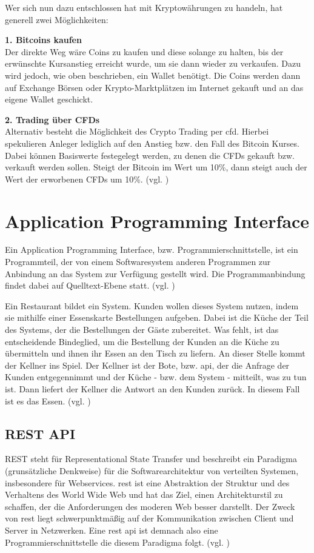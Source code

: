 \documentclass[oneside]{ausarbeitung}
\begin{document}
Wer sich nun dazu entschlossen hat mit Kryptowährungen zu handeln,
hat generell zwei Möglichkeiten:

\textbf{1. Bitcoins kaufen} \\
Der direkte Weg wäre Coins zu kaufen und diese solange zu halten, bis
der erwünschte Kursanstieg erreicht wurde, um sie dann wieder zu
verkaufen. Dazu wird jedoch, wie oben beschrieben, ein Wallet
benötigt. Die Coins werden dann auf Exchange Börsen oder
Krypto-Marktplätzen im Internet gekauft und an das eigene Wallet
geschickt.  

\textbf{2. Trading über CFDs} \\
Alternativ besteht die Möglichkeit des Crypto Trading per \ac{cfd}.
Hierbei spekulieren Anleger lediglich auf den Anstieg bzw. den Fall
des Bitcoin Kurses. Dabei können Basiswerte festegelegt werden, zu
denen die CFDs gekauft bzw. verkauft werden sollen. Steigt der Bitcoin
im Wert um 10\%, dann steigt auch der Wert der erworbenen CFDs um
10\%. (vgl. \cite{crypto_trading})


\section{Application Programming Interface}
\label{sec:api}

Ein Application Programming Interface, bzw. Programmierschnittstelle,
ist ein Programmteil, der von einem Softwaresystem anderen Programmen
zur Anbindung an das System zur Verfügung gestellt wird. Die
Programmanbindung findet dabei auf Quelltext-Ebene statt. (vgl.
\cite{api_definition})

Ein Restaurant bildet ein System. Kunden wollen dieses System nutzen,
indem sie mithilfe einer Essenskarte Bestellungen aufgeben. Dabei ist
die Küche der Teil des Systems, der die Bestellungen der Gäste
zubereitet. Was fehlt, ist das entscheidende Bindeglied, um die
Bestellung der Kunden an die Küche zu übermitteln und ihnen ihr
Essen an den Tisch zu liefern. An dieser Stelle kommt der Kellner ins
Spiel. Der Kellner ist der Bote, bzw. \ac{api}, der die Anfrage der
Kunden entgegennimmt und der Küche - bzw. dem System - mitteilt, was
zu tun ist. Dann liefert der Kellner die Antwort an den Kunden
zurück. In diesem Fall ist es das Essen. (vgl. \cite{api_example})    

\subsection{REST API}
\label{sub:rest_api}
REST steht für Representational State Transfer und beschreibt ein
Paradigma (grunsätzliche Denkweise) für die Softwarearchitektur von
verteilten Systemen, insbesondere für Webservices. \ac{rest} ist eine
Abstraktion der Struktur und des Verhaltens des World Wide Web und hat
das Ziel, einen Architekturstil zu schaffen, der die Anforderungen des
moderen Web besser darstellt. Der Zweck von \ac{rest} liegt
schwerpunktmäßig auf der Kommunikation zwischen Client und Server in
Netzwerken. Eine \ac{rest} \ac{api} ist demnach also eine
Programmierschnittstelle die diesem Paradigma folgt. (vgl.
\cite{rest})
\end{document}
